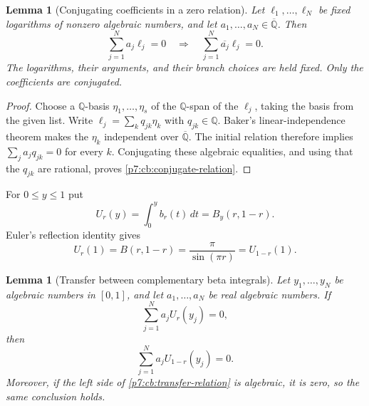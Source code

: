 \documentclass[11pt,a4paper]{article}
\newtheorem{lemma}[theorem]{Lemma}
\theoremstyle{definition}
\theoremstyle{remark}
\numberwithin{equation}{section}
\begin{document}
\begin{lemma}[Conjugating coefficients in a zero relation]
\label{p7:cb:conjugation}
Let $\ell_1,\ldots,\ell_N$ be fixed logarithms of nonzero
algebraic numbers, and let $a_1,\ldots,a_N\in\overline{\mathbb Q}$.
Then
\begin{equation}\label{p7:cb:conjugate-relation}
 \sum_{j=1}^N a_j\ell_j=0
 \quad\Longrightarrow\quad
 \sum_{j=1}^N\overline{a_j}\ell_j=0.
\end{equation}
The logarithms, their arguments, and their branch choices are held fixed.
Only the coefficients are conjugated.
\end{lemma}

\begin{proof}
Choose a $\mathbb Q$-basis $\eta_1,\ldots,\eta_s$ of the
$\mathbb Q$-span of the $\ell_j$, taking the basis from the
given list. Write $\ell_j=\sum_k q_{jk}\eta_k$ with
$q_{jk}\in\mathbb Q$. Baker's linear-independence theorem
makes the $\eta_k$ independent over $\overline{\mathbb Q}$.
The initial relation therefore implies
$\sum_j a_jq_{jk}=0$ for every $k$. Conjugating these algebraic
equalities, and using that the $q_{jk}$ are rational, proves
\eqref{p7:cb:conjugate-relation}.
\end{proof}

For $0\le y\le1$ put
\[
 U_r(y)=\int_0^y b_r(t)\,dt=B_y(r,1-r).
\]
Euler's reflection identity gives
\begin{equation}\label{p7:cb:complete}
 U_r(1)=B(r,1-r)=\frac{\pi}{\sin(\pi r)}=U_{1-r}(1).
\end{equation}

\begin{lemma}[Transfer between complementary beta integrals]
\label{p7:cb:transfer}
Let $y_1,\ldots,y_N$ be algebraic numbers in $[0,1]$, and let
$a_1,\ldots,a_N$ be real algebraic numbers. If
\begin{equation}\label{p7:cb:transfer-relation}
 \sum_{j=1}^N a_j U_r(y_j)=0,
\end{equation}
then
\[
 \sum_{j=1}^N a_j U_{1-r}(y_j)=0.
\]
Moreover, if the left side of \eqref{p7:cb:transfer-relation} is
algebraic, it is zero, so the same conclusion holds.
\end{lemma}
\end{document}
